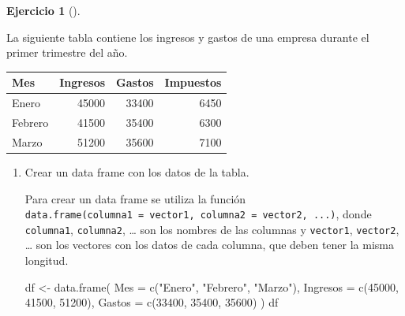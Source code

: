 \documentclass[
  spanish,
  a4paper,
]{scrreport}
\newenvironment{Shaded}{\begin{snugshade}}{\end{snugshade}}
\newcommand{\AttributeTok}[1]{\textcolor[rgb]{0.40,0.45,0.13}{#1}}
\newcommand{\DecValTok}[1]{\textcolor[rgb]{0.68,0.00,0.00}{#1}}
\newcommand{\FunctionTok}[1]{\textcolor[rgb]{0.28,0.35,0.67}{#1}}
\newcommand{\NormalTok}[1]{\textcolor[rgb]{0.00,0.23,0.31}{#1}}
\newcommand{\OtherTok}[1]{\textcolor[rgb]{0.00,0.23,0.31}{#1}}
\newcommand{\StringTok}[1]{\textcolor[rgb]{0.13,0.47,0.30}{#1}}
\theoremstyle{definition}
\newtheorem{exercise}{Ejercicio}[chapter]
\theoremstyle{remark}
\begin{document}
\begin{exercise}[]\protect\hypertarget{exr-dataframes-1}{}\label{exr-dataframes-1}

La siguiente tabla contiene los ingresos y gastos de una empresa durante
el primer trimestre del año.

\begin{longtable}[]{@{}lrrr@{}}
\toprule\noalign{}
Mes & Ingresos & Gastos & Impuestos \\
\midrule\noalign{}
\endhead
\bottomrule\noalign{}
\endlastfoot
Enero & 45000 & 33400 & 6450 \\
Febrero & 41500 & 35400 & 6300 \\
Marzo & 51200 & 35600 & 7100 \\
\end{longtable}

\begin{enumerate}
\def\labelenumi{\alph{enumi}.}
\item
  Crear un data frame con los datos de la tabla.

  \begin{tcolorbox}[enhanced jigsaw, titlerule=0mm, arc=.35mm, rightrule=.15mm, opacitybacktitle=0.6, leftrule=.75mm, colframe=quarto-callout-tip-color-frame, toptitle=1mm, breakable, colbacktitle=quarto-callout-tip-color!10!white, bottomrule=.15mm, colback=white, left=2mm, bottomtitle=1mm, opacityback=0, title=\textcolor{quarto-callout-tip-color}{\faLightbulb}\hspace{0.5em}{Solución}, toprule=.15mm, coltitle=black]

  Para crear un data frame se utiliza la función
  \texttt{data.frame(columna1\ =\ vector1,\ columna2\ =\ vector2,\ ...)},
  donde \texttt{columna1}, \texttt{columna2}, \ldots{} son los nombres
  de las columnas y \texttt{vector1}, \texttt{vector2}, \ldots{} son los
  vectores con los datos de cada columna, que deben tener la misma
  longitud.

\begin{Shaded}
\begin{Highlighting}[]
\NormalTok{df }\OtherTok{\textless{}{-}} \FunctionTok{data.frame}\NormalTok{(}
    \AttributeTok{Mes =} \FunctionTok{c}\NormalTok{(}\StringTok{"Enero"}\NormalTok{, }\StringTok{"Febrero"}\NormalTok{, }\StringTok{"Marzo"}\NormalTok{),}
    \AttributeTok{Ingresos =} \FunctionTok{c}\NormalTok{(}\DecValTok{45000}\NormalTok{, }\DecValTok{41500}\NormalTok{, }\DecValTok{51200}\NormalTok{),}
    \AttributeTok{Gastos =} \FunctionTok{c}\NormalTok{(}\DecValTok{33400}\NormalTok{, }\DecValTok{35400}\NormalTok{, }\DecValTok{35600}\NormalTok{)}
\NormalTok{    )}
\NormalTok{df }
\end{Highlighting}
\end{Shaded}


\end{tcolorbox}
\end{enumerate}
\end{exercise}
\end{document}
